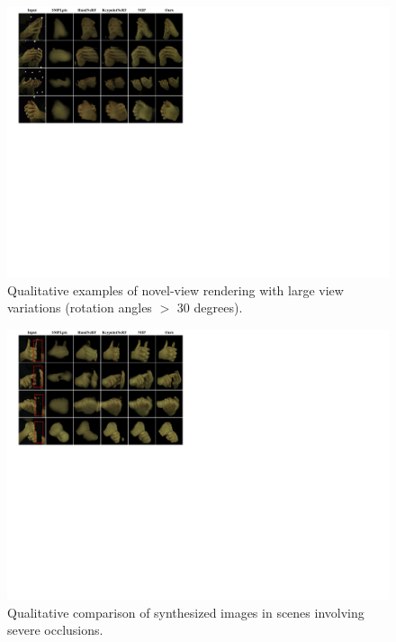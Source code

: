 \documentclass[letterpaper]{article} %
\begin{document}
\begin{figure}[t]
  \centering
  \includegraphics[width=1.0\hsize]{figures/large_view.pdf}
  \caption{Qualitative examples of novel-view rendering with large view variations (rotation angles $>$ 30 degrees).}
  \label{fig:large_view}
\end{figure}

\begin{figure}[t]
  \centering
  \includegraphics[width=1.0\hsize]{figures/occlusion.pdf}
  \caption{Qualitative comparison of synthesized images in scenes involving severe occlusions.}
  \label{fig:occlusion}
\end{figure}
\end{document}
